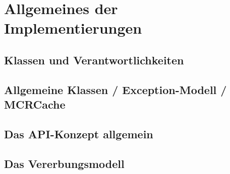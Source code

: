 %
%
\chapter{Allgemeines der Implementierungen} 
%
%
\section{Klassen und Verantwortlichkeiten }
\section{Allgemeine Klassen / Exception-Modell / MCRCache}
\section{Das API-Konzept allgemein}

%
\section{Das Vererbungsmodell}

